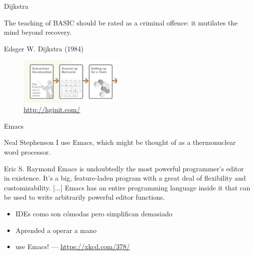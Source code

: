 \documentclass[14pt]{beamer}
\begin{document}
\begin{frame}{Dijkstra}
   \begin{block}{}\centering
   \normalsize The teaching of BASIC should be rated as
   a criminal offence: it mutilates the mind beyond recovery.
   \end{block}
  \vspace{-0.5cm}
  \begin{center} \scriptsize Edsger W. Dijkstra (1984) \end{center}

  \begin{figure}
    \centering
    \includegraphics[width=0.45\textwidth]{pics/svn-reeducation.jpg}
    \caption*{\url{http://hginit.com/}}
  \end{figure}
\end{frame}

\begin{frame}{Emacs}

  \begin{block}{\scriptsize Neal Stephenson} \centering
    \scriptsize I use Emacs, which might be thought of as a thermonuclear word processor.
  \end{block}

  \begin{block}{\scriptsize Eric S. Raymond} \centering
    \scriptsize Emacs is undoubtedly the most powerful programmer's editor in
    existence. It's a big, feature-laden program with a great deal of
    flexibility and customizability. [...] Emacs has an entire
    programming language inside it that can be used to write
    arbitrarily powerful editor functions.
  \end{block}

  \begin{itemize} \itemsep0em
    \item IDEs como  son cómodas pero simplifican demasiado
    \item Aprended a operar a mano 
    \item {} use Emacs! — \url{https://xkcd.com/378/}
  \end{itemize}

\end{frame}
\end{document}
